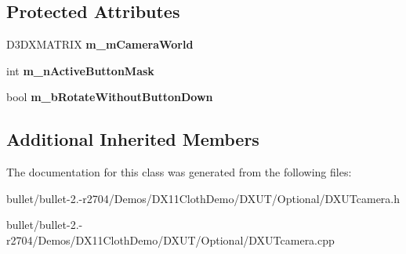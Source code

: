 \subsection*{Protected Attributes}
\begin{DoxyCompactItemize}
\item 
\hypertarget{class_c_first_person_camera_a4065145f014e4ea76ad27537418fd34e}{D3\+D\+X\+M\+A\+T\+R\+I\+X {\bfseries m\+\_\+m\+Camera\+World}}\label{class_c_first_person_camera_a4065145f014e4ea76ad27537418fd34e}

\item 
\hypertarget{class_c_first_person_camera_a443dce2d48aa73eaecffd696eed9bd94}{int {\bfseries m\+\_\+n\+Active\+Button\+Mask}}\label{class_c_first_person_camera_a443dce2d48aa73eaecffd696eed9bd94}

\item 
\hypertarget{class_c_first_person_camera_a5fbd2d7347724f3d22c2ff78d9547c52}{bool {\bfseries m\+\_\+b\+Rotate\+Without\+Button\+Down}}\label{class_c_first_person_camera_a5fbd2d7347724f3d22c2ff78d9547c52}

\end{DoxyCompactItemize}
\subsection*{Additional Inherited Members}


The documentation for this class was generated from the following files\+:\begin{DoxyCompactItemize}
\item 
bullet/bullet-\/2.-\/r2704/\+Demos/\+D\+X11\+Cloth\+Demo/\+D\+X\+U\+T/\+Optional/D\+X\+U\+Tcamera.\+h\item 
bullet/bullet-\/2.-\/r2704/\+Demos/\+D\+X11\+Cloth\+Demo/\+D\+X\+U\+T/\+Optional/D\+X\+U\+Tcamera.\+cpp\end{DoxyCompactItemize}
